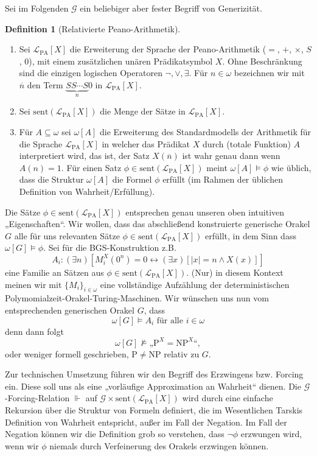 \documentclass[nofonts]{uebung}
\theoremstyle{definition}
\newtheorem{definition}[theorem]{Definition}
\def\P{\ensuremath{\mathrm{P}}}
\def\NP{\ensuremath{\mathrm{NP}}}
\begin{document}
Sei im Folgenden $\mathcal G$ ein beliebiger aber fester Begriff von Generizität.
\begin{definition}[Relativierte Peano-Arithmetik]
    \begin{enumerate}
        \item Sei $\mathcal L_{\mathrm{PA}}[X]$ die Erweiterung der Sprache der Peano-Arithmetik ($=$, $+$, $\times$, $S$, $0$), mit einem zusätzlichen unären Prädikatsymbol $X$.
Ohne Beschränkung sind die einzigen logischen Operatoren $\neg, \lor, \exists$.
Für $n\in\omega$ bezeichnen wir mit $\overline{n}$ den Term $\underbrace{SS\cdots S}_{n}0$ in $\mathcal L_{\mathrm{PA}}[X]$. 
        \item Sei $\mathrm{sent}(\mathcal L_{\mathrm{PA}}[X])$ die Menge der Sätze in $\mathcal L_{\mathrm{PA}}[X]$.
        \item Für $A\subseteq\omega$ sei $\omega[A]$ die Erweiterung des Standardmodells der Arithmetik für die Sprache $\mathcal L_{\mathrm{PA}}[X]$ in welcher das Prädikat $X$ durch (totale Funktion) $A$ interpretiert wird, das ist, der Satz $X(\overline{n})$ ist wahr genau dann wenn $A(n)=1$.
            Für einen Satz $\phi\in\mathrm{sent}(\mathcal L_{\mathrm{PA}}[X])$ meint $\omega[A]\vDash\phi $ wie üblich, dass die Struktur $\omega[A]$ die Formel $\phi$ erfüllt (im Rahmen der üblichen Definition von Wahrheit/Erfüllung).
    \end{enumerate}
\end{definition}
Die Sätze $\phi\in\mathrm{sent}(\mathcal L_{\mathrm{PA}}[X])$ entsprechen genau unseren oben intuitiven „Eigenschaften“.
Wir wollen, dass das abschließend konstruierte generische Orakel $G$ alle für uns relevanten Sätze $\phi\in\mathrm{sent}(\mathcal L_{\mathrm{PA}}[X])$ erfüllt, in dem Sinn dass $\omega[G]\vDash \phi$.
Sei für die BGS-Konstruktion z.B.
\[ A_i : (\exists n)[M^X_i(0^n)=0 \leftrightarrow (\exists x)[|x|=n\land X(x)]] \]
eine Familie an Sätzen aus $\phi\in\mathrm{sent}(\mathcal L_{\mathrm{PA}}[X])$. (Nur) in diesem Kontext meinen wir mit $\{M_i\}_{i\in\omega}$ eine vollständige Aufzählung der deterministischen Polymomialzeit-Orakel-Turing-Maschinen.
Wir wünschen uns nun vom entsprechenden generischen Orakel $G$, dass 
\[ \omega[G] \vDash A_i \text{ für alle $i\in\omega$} \]
denn dann folgt
\[ \omega[G] \not\vDash „\P^X=\NP^X“, \]
oder weniger formell geschrieben, $\P\neq\NP$ relativ zu $G$.

Zur technischen Umsetzung führen wir den Begriff des Erzwingens bzw. Forcing ein.
Diese soll uns als eine „vorläufige Approximation an Wahrheit“ \parencite[vgl.][]{fenner_oracle_2003} dienen.
Die $\mathcal G$-Forcing-Relation $\Vdash$ auf $\mathcal G\times \mathrm{sent}(\mathcal L_{\mathrm{PA}}[X])$  wird durch eine einfache Rekursion über die Struktur von Formeln definiert, die im Wesentlichen Tarskis Definition von Wahrheit entspricht, außer im Fall der Negation.  Im Fall der Negation können wir die Definition grob so verstehen, dass $\neg\phi$ erzwungen wird, wenn wir $\phi$ niemals durch Verfeinerung des Orakels erzwingen können.
\end{document}
